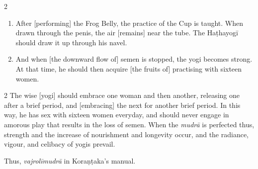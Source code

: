 \begin{nohyp}
\begin{multicols}{2}
\begin{eng}
\begin{enumerate}[nosep]
\item[55.] After [performing] the Frog Belly, the practice of the Cup is taught. When drawn through the penis, the air [remains] near the tube. The Haṭhayogī should draw it up through his navel.
\item[56.] And when [the downward flow of] semen is stopped, the yogi becomes strong. At that time, he should then acquire [the fruits of] practising with sixteen women.
\end{enumerate}
\end{eng}
\end{multicols}
\end{nohyp}

\begin{eng}

\Section*[Afterword]{[Afterword]}%


\begin{multicols}{2}
The wise [yogi] should embrace one woman and then another, releasing one after a brief period, and [embracing] the next for  another brief period. In this way, he has sex with sixteen women everyday, and should never engage in amorous play that results in the loss of semen. When the \textit{mudrā} is perfected thus, strength and the increase of nourishment and longevity occur, and the radiance, vigour, and celibacy of yogis prevail.

Thus, \textit{vajrolīmudrā} in Koraṇṭaka’s manual.
\end{multicols}
\end{eng}
\vskip 0.5cm

\pushpika


\newpage


